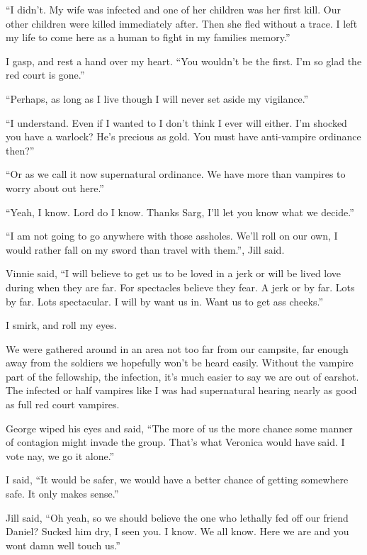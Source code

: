 ``I didn't. My wife was infected and one of her children was her first kill. Our other children were killed immediately after. Then she fled without a trace. I left my life to come here as a human to fight in my families memory.''

I gasp, and rest a hand over my heart. ``You wouldn't be the first. I'm so glad the red court is gone.''

``Perhaps, as long as I live though I will never set aside my vigilance.''

``I understand. Even if I wanted to I don't think I ever will either. I'm shocked you have a warlock? He's precious as gold. You must have anti-vampire ordinance then?''

``Or as we call it now supernatural ordinance. We have more than vampires to worry about out here.''

``Yeah, I know. Lord do I know. Thanks Sarg, I'll let you know what we decide.''

\parasep

``I am not going to go anywhere with those assholes. We'll roll on our own, I would rather fall on my sword than travel with them.'', Jill said.

Vinnie said, ``I will believe to get us to be loved in a jerk or will be lived love during when they are far. For spectacles believe they fear. A jerk or by far. Lots by far. Lots spectacular. I will by want us in. Want us to get ass cheeks.''

I smirk, and roll my eyes.

We were gathered around in an area not too far from our campsite, far enough away from the soldiers we hopefully won't be heard easily. Without the vampire part of the fellowship, the infection, it's much easier to say we are out of earshot. The infected or half vampires like I was had supernatural hearing nearly as good as full red court vampires.

George wiped his eyes and said, ``The more of us the more chance some manner of contagion might invade the group. That's what Veronica would have said. I vote nay, we go it alone.''

I said, ``It would be safer, we would have a better chance of getting somewhere safe. It only makes sense.''

Jill said, ``Oh yeah, so we should believe the one who lethally fed off our friend Daniel? Sucked him dry, I seen you. I know. We all know. Here we are and you wont damn well touch us.''

